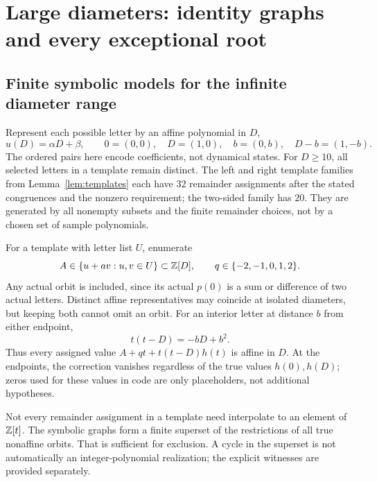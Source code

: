 \section{Large diameters: identity graphs and every exceptional root}\label{sec:symbolic}

\subsection{Finite symbolic models for the infinite diameter range}
Represent each possible letter by an affine polynomial in $D$,
\begin{equation}\label{eq:letters}
 u(D)=\alpha D+\beta,\qquad
 0=(0,0),\quad D=(1,0),\quad b=(0,b),\quad D-b=(1,-b).
\end{equation}
The ordered pairs here encode coefficients, not dynamical states.
For $D\ge10$, all selected letters in a template remain distinct.
The left and right template families from Lemma~\ref{lem:templates}
each have $32$ remainder assignments after the stated congruences
and the nonzero requirement; the two-sided family has $20$.
They are generated by all nonempty subsets and the finite remainder
choices, not by a chosen set of sample polynomials.

For a template with letter list $U$, enumerate
\begin{equation}\label{eq:intercepts}
 A\in\{u+av:u,v\in U\}\subset\mathbb Z[D],\qquad
 q\in\{-2,-1,0,1,2\}.
\end{equation}
Any actual orbit is included, since its actual $p(0)$ is a sum or
difference of two actual letters. Distinct affine representatives
may coincide at isolated diameters, but keeping both cannot omit
an orbit. For an interior letter at distance $b$ from either endpoint,
\begin{equation}\label{eq:linearcorrection}
 t(t-D)=-bD+b^2.
\end{equation}
Thus every assigned value $A+qt+t(t-D)h(t)$ is affine in $D$.
At the endpoints, the correction vanishes regardless of the true
values $h(0),h(D)$; zeros used for these values in code are only
placeholders, not additional hypotheses.

Not every remainder assignment in a template need interpolate to
an element of $\mathbb Z[t]$. The symbolic graphs form a finite superset
of the restrictions of all true nonaffine orbits. That is sufficient
for exclusion. A cycle in the superset is not automatically an
integer-polynomial realization; the explicit witnesses are provided
separately.

